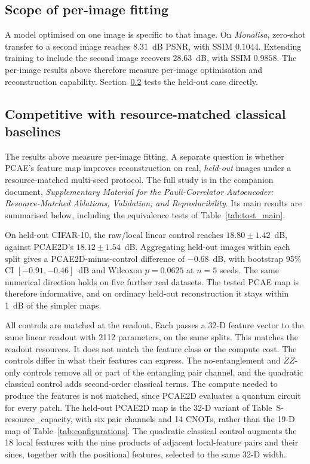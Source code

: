 \documentclass[pdflatex,sn-basic]{sn-jnl}
\begin{document}
\subsection{Scope of per-image fitting}
\label{sec:no_generalization}

A model optimised on one image is specific
to that image. On \textit{Monalisa}, zero-shot transfer to a
second image reaches $8.31$~dB PSNR, with SSIM $0.1044$. Extending training to
include the second image recovers $28.63$~dB, with SSIM $0.9858$. The per-image
results above therefore measure per-image optimisation and reconstruction
capability. Section~\ref{sec:ablation_relationship} tests the held-out case
directly.


\subsection{Competitive with resource-matched classical baselines}
\label{sec:ablation_relationship}
The results above measure per-image fitting. A separate question is whether
PCAE's feature map improves reconstruction on real, \emph{held-out} images under
a resource-matched multi-seed protocol. The full study is in the
companion document, \textit{Supplementary Material for the Pauli-Correlator Autoencoder: Resource-Matched Ablations, Validation, and Reproducibility}. Its
main results are summarised below, including the equivalence tests of
Table~\ref{tab:tost_main}.

On held-out CIFAR-10, the raw/local linear control reaches
$18.80\pm1.42$~dB, against PCAE2D's $18.12\pm1.54$~dB. Aggregating held-out
images within each split gives a PCAE2D-minus-control difference of $-0.68$~dB,
with bootstrap 95\% CI $[-0.91,-0.46]$~dB and Wilcoxon $p=0.0625$ at $n=5$
seeds. The same numerical direction holds on five further real datasets. The
tested PCAE map is therefore informative, and on ordinary held-out
reconstruction it stays within 1~dB of the simpler maps.

All controls are matched at the readout. Each passes a 32-D feature vector
to the same linear readout with 2112 parameters, on the same splits. This
matches the readout resources. It does not match the feature class or the
compute cost. The controls differ in what their features can express. The
no-entanglement and $ZZ$-only controls remove all or part of the entangling
pair channel, and the quadratic classical control adds second-order classical
terms. The compute needed to produce the features is not matched, since PCAE2D
evaluates a quantum circuit for every patch.
The held-out PCAE2D map is the 32-D variant of Table~S-resource\_capacity,
with six pair channels and 14 CNOTs, rather than the 19-D map of
Table~\ref{tab:configurations}. The quadratic classical control augments the
18 local features with the nine products of adjacent local-feature pairs and
their sines, together with the positional features, selected to the same
32-D width.
\end{document}
